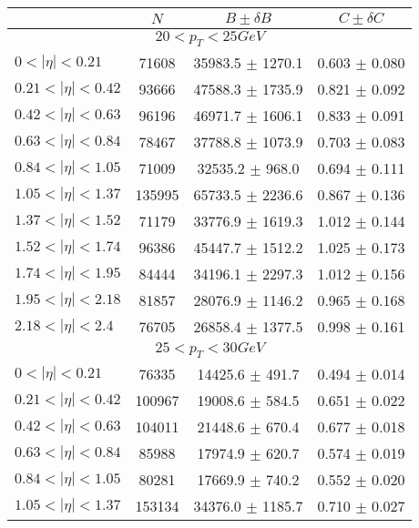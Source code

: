 \begin{tabular}{lccc}
\hline
    &   $N$   & $B \pm \delta B$  &  $C \pm \delta C$ \\
\hline
\hline
\multicolumn{4}{c}{$20 < p_{T} < 25 GeV$} \\
\hline
$0 < |\eta| <0.21$             & 71608      & 35983.5    $\pm$ 1270.1 & 0.603      $\pm$ 0.080 \\
$0.21 < |\eta| <0.42$          & 93666      & 47588.3    $\pm$ 1735.9 & 0.821      $\pm$ 0.092 \\
$0.42 < |\eta| <0.63$          & 96196      & 46971.7    $\pm$ 1606.1 & 0.833      $\pm$ 0.091 \\
$0.63 < |\eta| <0.84$          & 78467      & 37788.8    $\pm$ 1073.9 & 0.703      $\pm$ 0.083 \\
$0.84 < |\eta| <1.05$          & 71009      & 32535.2    $\pm$ 968.0 & 0.694      $\pm$ 0.111 \\
$1.05 < |\eta| <1.37$          & 135995     & 65733.5    $\pm$ 2236.6 & 0.867      $\pm$ 0.136 \\
$1.37 < |\eta| <1.52$          & 71179      & 33776.9    $\pm$ 1619.3 & 1.012      $\pm$ 0.144 \\
$1.52 < |\eta| <1.74$          & 96386      & 45447.7    $\pm$ 1512.2 & 1.025      $\pm$ 0.173 \\
$1.74 < |\eta| <1.95$          & 84444      & 34196.1    $\pm$ 2297.3 & 1.012      $\pm$ 0.156 \\
$1.95 < |\eta| <2.18$          & 81857      & 28076.9    $\pm$ 1146.2 & 0.965      $\pm$ 0.168 \\
$2.18 < |\eta| <2.4$           & 76705      & 26858.4    $\pm$ 1377.5 & 0.998      $\pm$ 0.161 \\
\hline
\multicolumn{4}{c}{$25 < p_{T} < 30 GeV$} \\
\hline
$0 < |\eta| <0.21$             & 76335      & 14425.6    $\pm$ 491.7 & 0.494      $\pm$ 0.014 \\
$0.21 < |\eta| <0.42$          & 100967     & 19008.6    $\pm$ 584.5 & 0.651      $\pm$ 0.022 \\
$0.42 < |\eta| <0.63$          & 104011     & 21448.6    $\pm$ 670.4 & 0.677      $\pm$ 0.018 \\
$0.63 < |\eta| <0.84$          & 85988      & 17974.9    $\pm$ 620.7 & 0.574      $\pm$ 0.019 \\
$0.84 < |\eta| <1.05$          & 80281      & 17669.9    $\pm$ 740.2 & 0.552      $\pm$ 0.020 \\
$1.05 < |\eta| <1.37$          & 153134     & 34376.0    $\pm$ 1185.7 & 0.710      $\pm$ 0.027 \\

\end{tabular}
